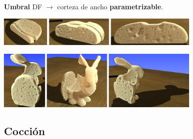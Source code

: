 \documentclass[spanish,unknownkeysallowed]{beamer}
\begin{document}
\begin{frame}
\textbf{Umbral} DF $\rightarrow$ corteza de ancho \textbf{parametrizable}.

\vspace{0.3cm}

\centerline{\includegraphics[width=10cm]{../figures/prebakebread}}

\centerline{\includegraphics[width=10cm]{../figures/prebakebunny}}
\end{frame}

\subsection{Cocción}
\end{document}
